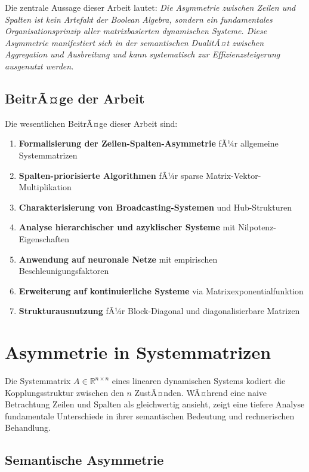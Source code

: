 ﻿\documentclass[a4paper,12pt]{report}
\theoremstyle{definition}
\begin{document}
	Die zentrale Aussage dieser Arbeit lautet: \textit{Die Asymmetrie zwischen Zeilen und Spalten ist kein Artefakt der Boolean Algebra, sondern ein fundamentales Organisationsprinzip aller matrixbasierten dynamischen Systeme. Diese Asymmetrie manifestiert sich in der semantischen DualitÃ¤t zwischen Aggregation und Ausbreitung und kann systematisch zur Effizienzsteigerung ausgenutzt werden.}
	
	\section{BeitrÃ¤ge der Arbeit}
	
	Die wesentlichen BeitrÃ¤ge dieser Arbeit sind:
	
	\begin{enumerate}
		\item \textbf{Formalisierung der Zeilen-Spalten-Asymmetrie} fÃ¼r allgemeine Systemmatrizen
		\item \textbf{Spalten-priorisierte Algorithmen} fÃ¼r sparse Matrix-Vektor-Multiplikation
		\item \textbf{Charakterisierung von Broadcasting-Systemen} und Hub-Strukturen
		\item \textbf{Analyse hierarchischer und azyklischer Systeme} mit Nilpotenz-Eigenschaften
		\item \textbf{Anwendung auf neuronale Netze} mit empirischen Beschleunigungsfaktoren
		\item \textbf{Erweiterung auf kontinuierliche Systeme} via Matrixexponentialfunktion
		\item \textbf{Strukturausnutzung} fÃ¼r Block-Diagonal und diagonalisierbare Matrizen
	\end{enumerate}
	
	\chapter{Asymmetrie in Systemmatrizen}
	
	Die Systemmatrix $A \in \mathbb{R}^{n \times n}$ eines linearen dynamischen Systems kodiert die Kopplungsstruktur zwischen den $n$ ZustÃ¤nden. WÃ¤hrend eine naive Betrachtung Zeilen und Spalten als gleichwertig ansieht, zeigt eine tiefere Analyse fundamentale Unterschiede in ihrer semantischen Bedeutung und rechnerischen Behandlung.
	
	\section{Semantische Asymmetrie}
	
\end{document}
